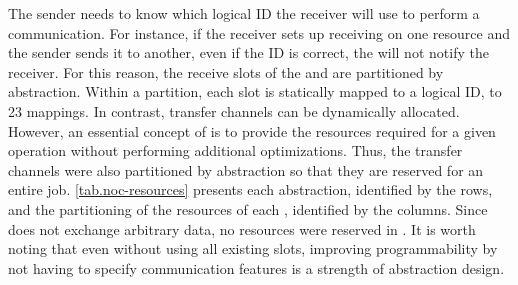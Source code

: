 			The sender needs to know which logical ID the receiver will use to perform
			a communication. For instance, if the receiver sets up receiving on one
			\dnoc resource and the sender sends it to another, even if the ID is correct,
			the \dma will not notify the receiver. For this reason, the receive slots
			of the \cnoc and \dnoc are  partitioned by abstraction. Within a
			partition, each slot is statically mapped to a logical ID,  to 23 mappings.
			In contrast, transfer channels can be dynamically allocated. However,
			an essential concept of \nanvixhal is to provide the resources required for
			a given operation without performing additional optimizations. Thus, the
			transfer channels were also partitioned by abstraction so that they are
			reserved for an entire job. \autoref{tab.noc-resources} presents each
			abstraction, identified by the rows, and the partitioning of the resources
			of each \noc, identified by the columns. Since \sync does not exchange
			arbitrary data, no resources were reserved in \dnoc. It is worth
			noting that even without using all existing slots, improving
			programmability by not having to specify communication features is a
			strength of abstraction design.


